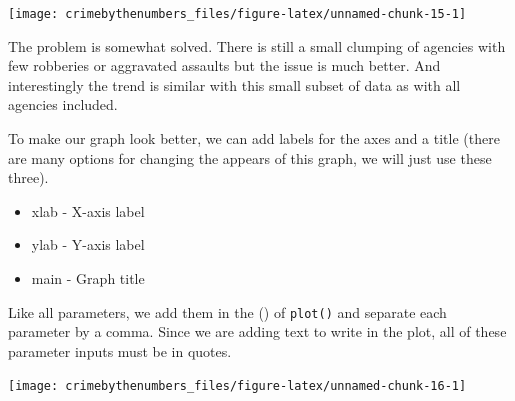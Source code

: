 \documentclass[
  12pt,
  openany]{book}
\newenvironment{Shaded}{\begin{snugshade}}{\end{snugshade}}
\newcommand{\AttributeTok}[1]{\textcolor[rgb]{0.61,0.61,0.61}{#1}}
\newcommand{\FunctionTok}[1]{\textcolor[rgb]{0,0,0}{#1}}
\newcommand{\NormalTok}[1]{#1}
\newcommand{\SpecialCharTok}[1]{\textcolor[rgb]{0,0,0}{#1}}
\newcommand{\StringTok}[1]{\textcolor[rgb]{0.5,0.5,0.5}{#1}}
\providecommand{\tightlist}{%
  \setlength{\itemsep}{0pt}\setlength{\parskip}{0pt}}
\begin{document}
\begin{Shaded}
\end{Shaded}

\begin{center}\texttt{[image: crimebythenumbers\_files/figure-latex/unnamed-chunk-15-1]} \end{center}

The problem is somewhat solved. There is still a small clumping of agencies with few robberies or aggravated assaults but the issue is much better. And interestingly the trend is similar with this small subset of data as with all agencies included.

To make our graph look better, we can add labels for the axes and a title (there are many options for changing the appears of this graph, we will just use these three).

\begin{itemize}
\tightlist
\item
  xlab - X-axis label
\item
  ylab - Y-axis label
\item
  main - Graph title
\end{itemize}

Like all parameters, we add them in the () of \texttt{plot()} and separate each parameter by a comma. Since we are adding text to write in the plot, all of these parameter inputs must be in quotes.

\begin{Shaded}
\end{Shaded}

\begin{center}\texttt{[image: crimebythenumbers\_files/figure-latex/unnamed-chunk-16-1]} \end{center}
\end{document}
